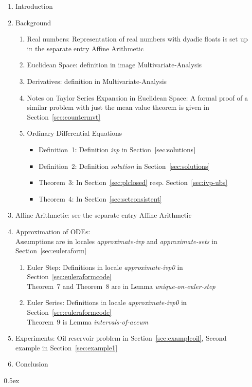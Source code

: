 \documentclass[11pt,a4paper]{article}
\begin{document}
\begin{enumerate}
\item Introduction
\item Background
  \begin{enumerate}
  \item Real numbers: Representation of real numbers with dyadic floats is set up in the separate
    entry Affine Arithmetic~\cite{Immler2014b}
  \item Euclidean Space: definition in image Multivariate-Analysis
  \item Derivatives: definition in Multivariate-Analysis
  \item Notes on Taylor Series Expansion in Euclidean Space: A formal proof of a similar problem
    with just the mean value theorem is given in Section~\ref{sec:countermvt}
  \item Ordinary Differential Equations
    \begin{itemize}
    \item Definition~1: Definition \textit{ivp} in Section~\ref{sec:solutions}
    \item Definition~2: Definition \textit{solution} in Section~\ref{sec:solutions}
    \item Theorem~3: In Section~\ref{sec:plclosed} resp. Section~\ref{sec:ivp-ubs}
    \item Theorem~4: In Section~\ref{sec:setconsistent}
    \end{itemize}
  \end{enumerate}
\item Affine Arithmetic: see the separate entry Affine Arithmetic~\cite{Immler2014b}
\item Approximation of ODEs:\\
  Assumptions are in locales \textit{approximate-ivp} and \textit{approximate-sets} in
  Section~\ref{sec:euleraform}
  \begin{enumerate}
  \item Euler Step: Definitions in locale \textit{approximate-ivp0} in Section~\ref{sec:euleraformcode} \\
    Theorem~7 and Theorem~8 are in Lemma \textit{unique-on-euler-step}
  \item Euler Series: Definitions in locale \textit{approximate-ivp0} in Section~\ref{sec:euleraformcode} \\
    Theorem~9 is Lemma \textit{intervals-of-accum}
  \end{enumerate}
\item Experiments: Oil reservoir problem in Section~\ref{sec:exampleoil}, Second example in
  Section~\ref{sec:example1}
\item Conclusion
\end{enumerate}

\tableofcontents

\parindent 0pt\parskip 0.5ex





\end{document}
